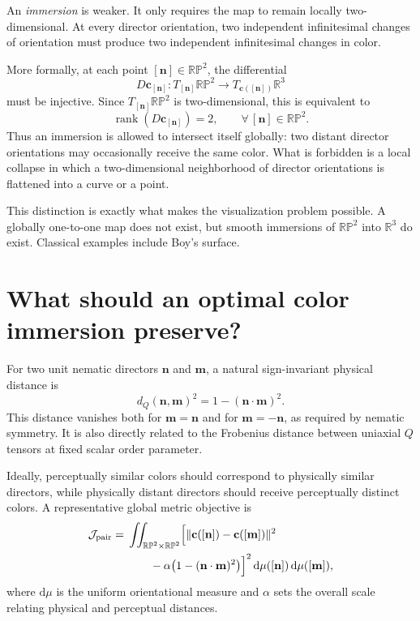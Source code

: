 \documentclass[11pt]{article}
\newcommand{\RP}{\mathbb{RP}}
\newcommand{\RR}{\mathbb{R}}
\newcommand{\vect}[1]{\mathbf{#1}}
\begin{document}
An \emph{immersion} is weaker. It only requires the map to remain locally two-dimensional. At every director orientation, two independent infinitesimal changes of orientation must produce two independent infinitesimal changes in color.

More formally, at each point $[\vect n]\in\RP^2$, the differential
\[
D\vect c_{[\vect n]}:
T_{[\vect n]}\RP^2\longrightarrow
T_{\vect c([\vect n])}\RR^3
\]
must be injective. Since $T_{[\vect n]}\RP^2$ is two-dimensional, this is equivalent to
\[
\operatorname{rank}\!\left(D\vect c_{[\vect n]}\right)=2,
\qquad \forall\,[\vect n]\in\RP^2.
\]
Thus an immersion is allowed to intersect itself globally: two distant director orientations may occasionally receive the same color. What is forbidden is a local collapse in which a two-dimensional neighborhood of director orientations is flattened into a curve or a point.

This distinction is exactly what makes the visualization problem possible. A globally one-to-one map does not exist, but smooth immersions of $\RP^2$ into $\RR^3$ do exist. Classical examples include Boy's surface.

\section{What should an optimal color immersion preserve?}

For two unit nematic directors $\vect n$ and $\vect m$, a natural sign-invariant physical distance is
\[
d_Q(\vect n,\vect m)^2=1-(\vect n\cdot\vect m)^2.
\]
This distance vanishes both for $\vect m=\vect n$ and for $\vect m=-\vect n$, as required by nematic symmetry. It is also directly related to the Frobenius distance between uniaxial $Q$ tensors at fixed scalar order parameter.

Ideally, perceptually similar colors should correspond to physically similar directors, while physically distant directors should receive perceptually distinct colors. A representative global metric objective is
\begin{align*}
\mathcal J_{\mathrm{pair}}
={}&\iint_{\RP^2\times\RP^2}
\Bigl[
\lVert\vect c([\vect n])-\vect c([\vect m])\rVert^2\\
&\qquad-\alpha\bigl(1-(\vect n\cdot\vect m)^2\bigr)
\Bigr]^2\,
\mathrm d\mu([\vect n])\,\mathrm d\mu([\vect m]),
\end{align*}
where $\mathrm d\mu$ is the uniform orientational measure and $\alpha$ sets the overall scale relating physical and perceptual distances.
\end{document}
